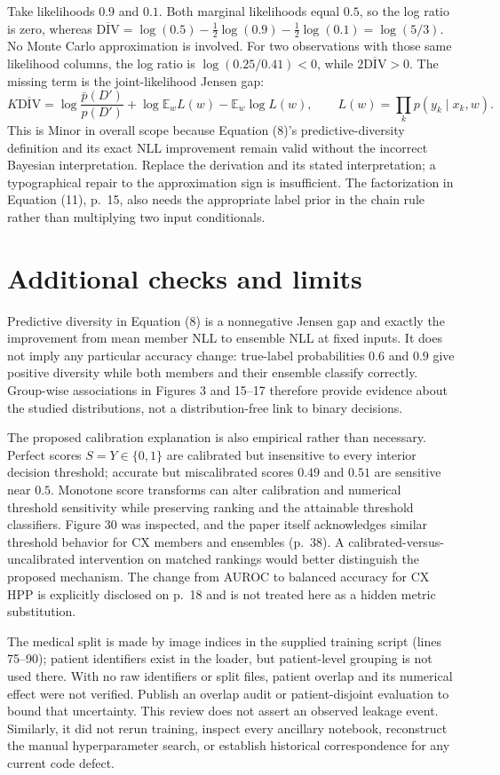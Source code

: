 \documentclass[10pt]{article}
\begin{document}
Take likelihoods \(0.9\) and \(0.1\). Both marginal likelihoods equal \(0.5\), so the log ratio is zero, whereas \(\overline{\mathrm{DIV}}=\log(0.5)-\tfrac12\log(0.9)-\tfrac12\log(0.1)=\log(5/3)\). No Monte Carlo approximation is involved. For two observations with those same likelihood columns, the log ratio is \(\log(0.25/0.41)<0\), while \(2\overline{\mathrm{DIV}}>0\). The missing term is the joint-likelihood Jensen gap: \[K\overline{\mathrm{DIV}}=\log\frac{\bar p(D')}{p(D')}+\log\mathbb E_w L(w)-\mathbb E_w\log L(w),\qquad L(w)=\prod_k p(y_k\mid x_k,w).\] This is Minor in overall scope because Equation (8)’s predictive-diversity definition and its exact NLL improvement remain valid without the incorrect Bayesian interpretation. Replace the derivation and its stated interpretation; a typographical repair to the approximation sign is insufficient. The factorization in Equation (11), p. 15, also needs the appropriate label prior in the chain rule rather than multiplying two input conditionals.\par
\section*{Additional checks and limits}
Predictive diversity in Equation (8) is a nonnegative Jensen gap and exactly the improvement from mean member NLL to ensemble NLL at fixed inputs. It does not imply any particular accuracy change: true-label probabilities \(0.6\) and \(0.9\) give positive diversity while both members and their ensemble classify correctly. Group-wise associations in Figures 3 and 15–17 therefore provide evidence about the studied distributions, not a distribution-free link to binary decisions.\par
The proposed calibration explanation is also empirical rather than necessary. Perfect scores \(S=Y\in\{0,1\}\) are calibrated but insensitive to every interior decision threshold; accurate but miscalibrated scores \(0.49\) and \(0.51\) are sensitive near \(0.5\). Monotone score transforms can alter calibration and numerical threshold sensitivity while preserving ranking and the attainable threshold classifiers. Figure 30 was inspected, and the paper itself acknowledges similar threshold behavior for CX members and ensembles (p. 38). A calibrated-versus-uncalibrated intervention on matched rankings would better distinguish the proposed mechanism. The change from AUROC to balanced accuracy for CX HPP is explicitly disclosed on p. 18 and is not treated here as a hidden metric substitution.\par
The medical split is made by image indices in the supplied training script (lines 75–90); patient identifiers exist in the loader, but patient-level grouping is not used there. With no raw identifiers or split files, patient overlap and its numerical effect were not verified. Publish an overlap audit or patient-disjoint evaluation to bound that uncertainty. This review does not assert an observed leakage event. Similarly, it did not rerun training, inspect every ancillary notebook, reconstruct the manual hyperparameter search, or establish historical correspondence for any current code defect.\par
\end{document}
